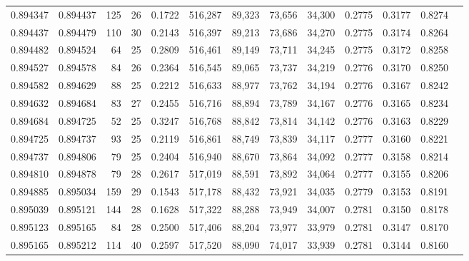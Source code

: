\begin{tabular}{rrrrrrrrrrrrr}
0.894347 & 0.894437 &   125 &  26 &                                     0.1722 & 516,287 &  89,323 &  73,656 &  34,300 & 0.2775 & 0.3177 & 0.8274 \\
0.894437 & 0.894479 &   110 &  30 &                                     0.2143 & 516,397 &  89,213 &  73,686 &  34,270 & 0.2775 & 0.3174 & 0.8264 \\
0.894482 & 0.894524 &    64 &  25 &                                     0.2809 & 516,461 &  89,149 &  73,711 &  34,245 & 0.2775 & 0.3172 & 0.8258 \\
0.894527 & 0.894578 &    84 &  26 &                                     0.2364 & 516,545 &  89,065 &  73,737 &  34,219 & 0.2776 & 0.3170 & 0.8250 \\
0.894582 & 0.894629 &    88 &  25 &                                     0.2212 & 516,633 &  88,977 &  73,762 &  34,194 & 0.2776 & 0.3167 & 0.8242 \\
0.894632 & 0.894684 &    83 &  27 &                                     0.2455 & 516,716 &  88,894 &  73,789 &  34,167 & 0.2776 & 0.3165 & 0.8234 \\
0.894684 & 0.894725 &    52 &  25 &                                     0.3247 & 516,768 &  88,842 &  73,814 &  34,142 & 0.2776 & 0.3163 & 0.8229 \\
0.894725 & 0.894737 &    93 &  25 &                                     0.2119 & 516,861 &  88,749 &  73,839 &  34,117 & 0.2777 & 0.3160 & 0.8221 \\
0.894737 & 0.894806 &    79 &  25 &                                     0.2404 & 516,940 &  88,670 &  73,864 &  34,092 & 0.2777 & 0.3158 & 0.8214 \\
0.894810 & 0.894878 &    79 &  28 &                                     0.2617 & 517,019 &  88,591 &  73,892 &  34,064 & 0.2777 & 0.3155 & 0.8206 \\
0.894885 & 0.895034 &   159 &  29 &                                     0.1543 & 517,178 &  88,432 &  73,921 &  34,035 & 0.2779 & 0.3153 & 0.8191 \\
0.895039 & 0.895121 &   144 &  28 &                                     0.1628 & 517,322 &  88,288 &  73,949 &  34,007 & 0.2781 & 0.3150 & 0.8178 \\
0.895123 & 0.895165 &    84 &  28 &                                     0.2500 & 517,406 &  88,204 &  73,977 &  33,979 & 0.2781 & 0.3147 & 0.8170 \\
0.895165 & 0.895212 &   114 &  40 &                                     0.2597 & 517,520 &  88,090 &  74,017 &  33,939 & 0.2781 & 0.3144 & 0.8160 \\

\end{tabular}
